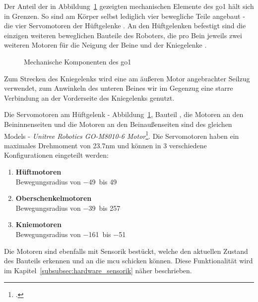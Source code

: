 Der Anteil der in Abbildung~\ref{fig:mechanische_komponenten} gezeigten mechanischen Elemente des \gls{go1} hält sich in Grenzen.
So sind am Körper selbst lediglich vier bewegliche Teile angebaut - die vier Servomotoren
der Hüftgelenke .
An den Hüftgelenken befestigt sind die einzigen weiteren beweglichen Bauteile des Roboters,
die pro Bein jeweils zwei weiteren Motoren für die Neigung der Beine  und der Kniegelenke .
\begin{figure}[h]
    \caption[Mechanische Komponenten des Go1]{Mechanische Komponenten des \gls{go1}}\label{fig:mechanische_komponenten}
\end{figure}
Zum Strecken des Kniegelenks wird eine am äußeren Motor angebrachter Seilzug  verwendet,
zum Anwinkeln des unteren Beines wir im Gegenzug eine starre Verbindung  an der Vorderseite des Kniegelenks genutzt.

Die Servomotoren am Hüftgelenk - Abbildung~\ref{fig:mechanische_komponenten}, Bauteil , die Motoren an den Beininnenseiten 
und die Motoren an den Beinaußenseiten  sind des gleichen Models -
\emph{Unitree Robotics GO-M8010-6 Motor}\footcite{go_motor}.
Die Servomotoren  haben ein maximales Drehmoment von \num{23.7}\gls{nm} und können in 3 verschiedene Konfigurationen
eingeteilt werden:
\begin{enumerate}
    \item \textbf{Hüftmotoren}\\
    Bewegungsradius von \num{-49}\textdegree~bis \num{49}\textdegree
    \item \textbf{Oberschenkelmotoren}\\
    Bewegungsradius von \num{-39}\textdegree~bis \num{257}\textdegree
    \item \textbf{Kniemotoren}\\
    Bewegungsradius von \num{-161}\textdegree~bis \num{-51}\textdegree
\end{enumerate}
Die Motoren sind ebenfalls mit Sensorik bestückt, welche den aktuellen Zustand des Bauteils erkennen und
an die \gls{mcu} schicken können.
Diese Funktionalität wird im Kapitel~\ref{subsubsec:hardware_sensorik} näher beschrieben.

